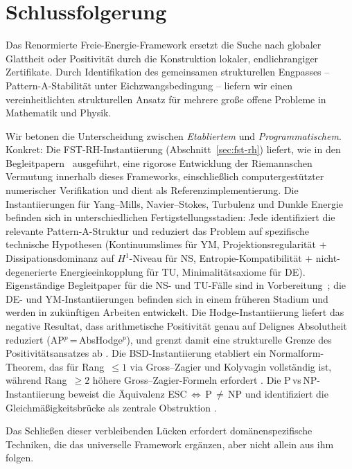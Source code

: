 \documentclass[12pt,a4paper]{article}
\theoremstyle{definition}
\theoremstyle{remark}
\begin{document}
\section{Schlussfolgerung}

Das Renormierte Freie-Energie-Framework ersetzt die Suche nach globaler Glattheit oder Positivität durch die Konstruktion lokaler, endlichrangiger Zertifikate. Durch Identifikation des gemeinsamen strukturellen Engpasses -- Pattern-A-Stabilität unter Eichzwangsbedingung -- liefern wir einen vereinheitlichten strukturellen Ansatz für mehrere große offene Probleme in Mathematik und Physik.

Wir betonen die Unterscheidung zwischen \emph{Etabliertem} und \emph{Programmatischem}. Konkret: Die FST-RH-Instantiierung (Abschnitt~\ref{sec:fst-rh}) liefert, wie in den Begleitpapern~\cite{Geiger2026a,Geiger2026b,Geiger2026c} ausgeführt, eine rigorose Entwicklung der Riemannschen Vermutung innerhalb dieses Frameworks, einschließlich computergestützter numerischer Verifikation und dient als Referenzimplementierung. Die Instantiierungen für Yang--Mills, Navier--Stokes, Turbulenz und Dunkle Energie befinden sich in unterschiedlichen Fertigstellungsstadien: Jede identifiziert die relevante Pattern-A-Struktur und reduziert das Problem auf spezifische technische Hypothesen (Kontinuumslimes für YM, Projektionsregularität + Dissipationsdominanz auf $H^1$-Niveau für NS, Entropie-Kompatibilität + nicht-degenerierte Energieeinkopplung für TU, Minimalitätsaxiome für DE). Eigenständige Begleitpaper für die NS- und TU-Fälle sind in Vorbereitung~\cite{Geiger2026-NS,Geiger2026-TU}; die DE- und YM-Instantiierungen befinden sich in einem früheren Stadium und werden in zukünftigen Arbeiten entwickelt. Die Hodge-Instantiierung liefert das negative Resultat, dass arithmetische Positivität genau auf Delignes Absolutheit reduziert (AP$^p$\,=\,AbsHodge$^p$), und grenzt damit eine strukturelle Grenze des Positivitätsansatzes ab \cite{Geiger2026-Hodge}. Die BSD-Instantiierung etabliert ein Normalform-Theorem, das für Rang~$\leq 1$ via Gross--Zagier und Kolyvagin vollständig ist, während Rang~$\geq 2$ höhere Gross--Zagier-Formeln erfordert \cite{Geiger2026-BSD}. Die P\,vs\,NP-Instantiierung beweist die Äquivalenz ESC\,$\Leftrightarrow$\,P\,$\neq$\,NP und identifiziert die Gleichmäßigkeitsbrücke als zentrale Obstruktion \cite{Geiger2026-PvsNP}.

Das Schließen dieser verbleibenden Lücken erfordert domänenspezifische Techniken, die das universelle Framework ergänzen, aber nicht allein aus ihm folgen.
\end{document}
